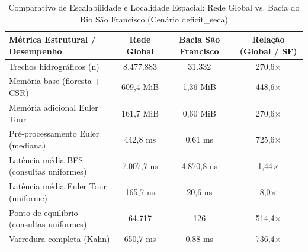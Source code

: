 \begin{table}[htbp]
\centering
\footnotesize
\caption{Comparativo de Escalabilidade e Localidade Espacial: Rede Global vs. Bacia do Rio São Francisco (Cenário deficit\_seca)}
\label{tab:comparacao_global_sf}
\begin{tabular}{lccc}
\toprule
Métrica Estrutural / Desempenho & Rede Global & Bacia São Francisco & Relação (Global / SF) \\
\midrule
Trechos hidrográficos (n) & 8.477.883 & 31.332 & 270,6$\times$ \\
Memória base (floresta + CSR) & 609,4 MiB & 1,36 MiB & 448,6$\times$ \\
Memória adicional Euler Tour & 161,7 MiB & 0,60 MiB & 270,6$\times$ \\
Pré-processamento Euler (mediana) & 442,8 ms & 0,61 ms & 725,6$\times$ \\
Latência média BFS (consultas uniformes) & 7.007,7 ns & 4.870,8 ns & 1,44$\times$ \\
Latência média Euler Tour (uniforme) & 165,7 ns & 20,6 ns & 8,0$\times$ \\
Ponto de equilíbrio (consultas uniformes) & 64.717 & 126 & 514,4$\times$ \\
Varredura completa (Kahn) & 650,7 ms & 0,88 ms & 736,4$\times$ \\
\bottomrule
\end{tabular}
\end{table}